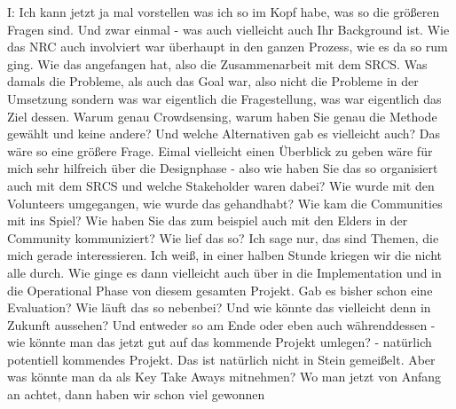 I: Ich kann jetzt ja mal vorstellen was ich so im Kopf habe, was so die größeren Fragen sind. Und zwar einmal - was auch vielleicht auch Ihr Background ist. Wie das NRC auch involviert war überhaupt in den ganzen Prozess, wie es da so rum ging. Wie das angefangen hat, also die Zusammenarbeit mit dem SRCS. Was damals die Probleme, als auch das Goal war, also nicht die Probleme in der Umsetzung sondern was war eigentlich die Fragestellung, was war eigentlich das Ziel dessen. Warum genau Crowdsensing, warum haben Sie genau die Methode gewählt und keine andere? Und welche Alternativen gab es vielleicht auch? Das wäre so eine größere Frage. Eimal vielleicht einen Überblick zu geben wäre für mich sehr hilfreich über die Designphase - also wie haben Sie das so organisiert auch mit dem SRCS und welche Stakeholder waren dabei? Wie wurde mit den Volunteers umgegangen, wie wurde das gehandhabt? Wie kam die Communities mit ins Spiel? Wie haben Sie das zum beispiel auch mit den Elders in der Community kommuniziert? Wie lief das so? Ich sage nur, das sind Themen, die mich gerade interessieren. Ich weiß, in einer halben Stunde kriegen wir die nicht alle durch. Wie ginge es dann vielleicht auch über in die Implementation und in die Operational Phase von diesem gesamten Projekt. Gab es bisher schon eine Evaluation? Wie läuft das so nebenbei? Und wie könnte das vielleicht denn in Zukunft aussehen? Und entweder so am Ende oder eben auch währenddessen - wie könnte man das jetzt gut auf das kommende Projekt umlegen? - natürlich potentiell kommendes Projekt. Das ist natürlich nicht in Stein gemeißelt. Aber was könnte man da als Key Take Aways mitnehmen? Wo man jetzt von Anfang an achtet, dann  haben wir schon viel gewonnen

